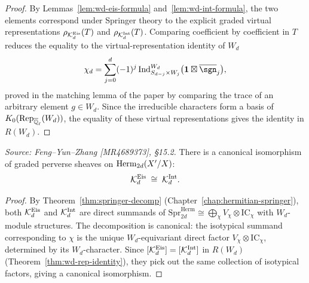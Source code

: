 \begin{proof}
  By Lemmas~\ref{lem:wd-eis-formula} and~\ref{lem:wd-int-formula}, the two elements
  correspond under Springer theory to the explicit graded virtual representations
  \(\rho_{\mathcal{K}_d^{\mathrm{Eis}}}(T)\) and \(\rho_{\mathcal{K}_d^{\mathrm{Int}}}(T)\). Comparing
  coefficient by coefficient in \(T\) reduces the equality to the virtual-representation
  identity of \(W_d\)
  \[
    \chi_d = \sum_{j=0}^{d} (-1)^j
      \Ind_{S_{d-j}\times W_j}^{W_d}\bigl(\mathbf{1}\boxtimes\overline{\sgn}_j\bigr),
  \]
  proved in the matching lemma of the paper by comparing the trace of an arbitrary
  element \(g\in W_d\). Since the irreducible characters form a basis of
  \(K_0(\operatorname{Rep}_{\overline{\mathbb{Q}}_\ell}(W_d))\), the equality of these virtual representations gives the
  identity in \(R(W_d)\).
\end{proof}

\begin{corollary}
  \label{cor:K-Eis-iso-K-Int}
  \textit{Source: Feng--Yun--Zhang [MR4689373], \S15.2.}
  There is a canonical isomorphism of graded perverse sheaves on \(\operatorname{Herm}_{2d}(X'/X)\):
  \[
    \mathcal{K}_d^{\mathrm{Eis}} \;\cong\; \mathcal{K}_d^{\mathrm{Int}}.
  \]
\end{corollary}

\begin{proof}
  By Theorem~\ref{thm:springer-decomp} (Chapter~\ref{chap:hermitian-springer}), both
  \(\mathcal{K}_d^{\mathrm{Eis}}\) and \(\mathcal{K}_d^{\mathrm{Int}}\) are direct summands of
  \(\mathrm{Spr}^{\mathrm{Herm}}_{2d} \cong \bigoplus_\chi V_\chi \otimes \mathrm{IC}_\chi\)
  with \(W_d\)-module structures.  The decomposition is canonical: the isotypical summand
  corresponding to \(\chi\) is the unique \(W_d\)-equivariant direct factor
  \(V_\chi \otimes \mathrm{IC}_\chi\), determined by its \(W_d\)-character. Since
  \([\mathcal{K}_d^{\mathrm{Eis}}] = [\mathcal{K}_d^{\mathrm{Int}}]\) in \(R(W_d)\) (Theorem~\ref{thm:wd-rep-identity}),
  they pick out the same collection of isotypical factors, giving a canonical isomorphism.
\end{proof}

